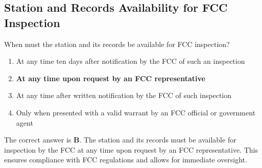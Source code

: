 \subsection{Station and Records Availability for FCC Inspection}
\label{T1F01}

\begin{tcolorbox}[colback=gray!10!white,colframe=black!75!black,title=T1F01]
When must the station and its records be available for FCC inspection?
\begin{enumerate}[label=\Alph*),noitemsep]
    \item At any time ten days after notification by the FCC of such an inspection
    \item \textbf{At any time upon request by an FCC representative}
    \item At any time after written notification by the FCC of such inspection
    \item Only when presented with a valid warrant by an FCC official or government agent
\end{enumerate}
\end{tcolorbox}

The correct answer is \textbf{B}. The station and its records must be available for inspection by the FCC at any time upon request by an FCC representative. This ensures compliance with FCC regulations and allows for immediate oversight.